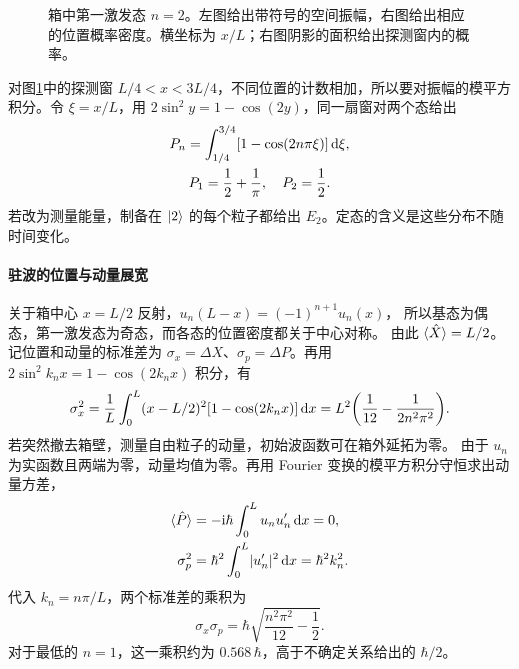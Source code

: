 \begin{figure}[htbp]
    \centering
    \caption{箱中第一激发态 $n = 2$。左图给出带符号的空间振幅，右图给出相应的位置概率密度。横坐标为 $x/L$；右图阴影的面积给出探测窗内的概率。}
    \label{fig:well-detection}
\end{figure}
对图\ref{fig:well-detection}中的探测窗 $L/4 < x < 3L/4$，不同位置的计数相加，所以要对振幅的模平方积分。令 $\xi = x/L$，用 $2\sin^2 y = 1 - \cos(2y)$，同一扇窗对两个态给出
\begin{subequations}
    \begin{gather}
        P_n = \int_{1/4}^{3/4}[1 - \cos(2n\pi\xi)]\mathop{}\!\mathrm{d}\xi,\\
        P_1 = \frac12 + \frac1\pi,\quad P_2 = \frac12 .
    \end{gather}
\end{subequations}
若改为测量能量，制备在 $\lvert2\rangle$ 的每个粒子都给出 $E_2$。定态的含义是这些分布不随时间变化。

\paragraph{驻波的位置与动量展宽}
关于箱中心 $x = L/2$ 反射，$u_n(L - x) = (-1)^{n+1}u_n(x)$，
所以基态为偶态，第一激发态为奇态，而各态的位置密度都关于中心对称。
由此 $\langle\hat{X}\rangle = L/2$。记位置和动量的标准差为 $\sigma_x = \Delta X$、$\sigma_p = \Delta P$。再用 $2\sin^2 k_nx = 1 - \cos(2k_nx)$ 积分，有
\begin{equation}\label{eq:qm-infinite-well-position-variance}
    \sigma_x^2 = \frac1L\int_0^L(x - L/2)^2[1 - \cos(2k_nx)]\mathop{}\!\mathrm{d} x
    = L^2\bigg(\frac1{12} - \frac1{2n^2\pi^2}\bigg).
\end{equation}
若突然撤去箱壁，测量自由粒子的动量，初始波函数可在箱外延拓为零。
由于 $u_n$ 为实函数且两端为零，动量均值为零。再用 Fourier 变换的模平方积分守恒求出动量方差，
\begin{subequations}
    \begin{align}
        \langle\hat{P}\rangle &= -\mathrm{i}\hbar\int_0^L u_nu_n'\mathop{}\!\mathrm{d} x = 0,\\
        \sigma_p^2 &= \hbar^2\int_0^L\lvert u_n'\rvert^2\mathop{}\!\mathrm{d} x = \hbar^2k_n^2 .
    \end{align}
\end{subequations}
代入 $k_n = n\pi/L$，两个标准差的乘积为
\begin{equation}
    \sigma_x\sigma_p = \hbar\sqrt{\frac{n^2\pi^2}{12} - \frac12}.
\end{equation}
对于最低的 $n = 1$，这一乘积约为 $0.568\,\hbar$，高于不确定关系给出的 $\hbar/2$。

